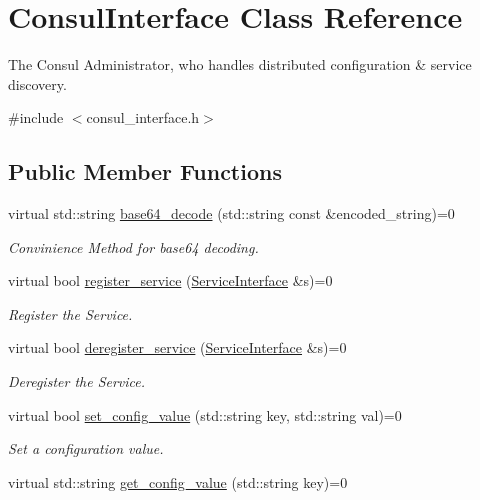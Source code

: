 \hypertarget{classConsulInterface}{}\section{Consul\+Interface Class Reference}
\label{classConsulInterface}


The Consul Administrator, who handles distributed configuration \& service discovery.  




{\ttfamily \#include $<$consul\+\_\+interface.\+h$>$}

\subsection*{Public Member Functions}
\begin{DoxyCompactItemize}
\item 
virtual std\+::string \hyperlink{classConsulInterface_a636b134672f2c150f6b38fc821fb2348}{base64\+\_\+decode} (std\+::string const \&encoded\+\_\+string)=0
\begin{DoxyCompactList}\small\item\em Convinience Method for base64 decoding. \end{DoxyCompactList}\item 
virtual bool \hyperlink{classConsulInterface_ad1d3a241b2fc31e4b13789a49a0d010a}{register\+\_\+service} (\hyperlink{classServiceInterface}{Service\+Interface} \&s)=0\hypertarget{classConsulInterface_ad1d3a241b2fc31e4b13789a49a0d010a}{}\label{classConsulInterface_ad1d3a241b2fc31e4b13789a49a0d010a}

\begin{DoxyCompactList}\small\item\em Register the Service. \end{DoxyCompactList}\item 
virtual bool \hyperlink{classConsulInterface_ac97f7a426f3de5023edc637ab984b4c4}{deregister\+\_\+service} (\hyperlink{classServiceInterface}{Service\+Interface} \&s)=0\hypertarget{classConsulInterface_ac97f7a426f3de5023edc637ab984b4c4}{}\label{classConsulInterface_ac97f7a426f3de5023edc637ab984b4c4}

\begin{DoxyCompactList}\small\item\em Deregister the Service. \end{DoxyCompactList}\item 
virtual bool \hyperlink{classConsulInterface_a98ce2623db59b3f8804691a4039957a8}{set\+\_\+config\+\_\+value} (std\+::string key, std\+::string val)=0
\begin{DoxyCompactList}\small\item\em Set a configuration value. \end{DoxyCompactList}\item 
virtual std\+::string \hyperlink{classConsulInterface_a1cc4bdfe75f86f69626e109847aba6af}{get\+\_\+config\+\_\+value} (std\+::string key)=0\hypertarget{classConsulInterface_a1cc4bdfe75f86f69626e109847aba6af}{}\label{classConsulInterface_a1cc4bdfe75f86f69626e109847aba6af}


\end{DoxyCompactItemize}
